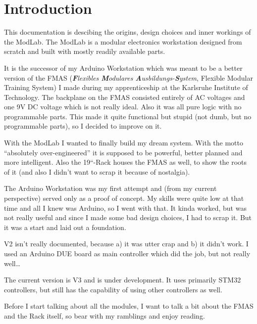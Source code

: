 \chapter{Introduction}

This documentation is descibing the origins, design choices and inner workings of the ModLab. The ModLab is a modular electronics workstation designed from scratch and built with mostly readily available parts. 

It is the successor of my Arduino Workstation which was meant to be a better version of the FMAS (\textit{\textbf{F}lexibles \textbf{M}odulares \textbf{A}usbildungs-\textbf{S}ystem}, Flexible Modular Training System) I made during my apprenticeship at the Karlsruhe Institute of Technology. The backplane on the FMAS consisted entirely of AC voltages and one 9V DC voltage which is not really ideal. Also it was all pure logic with no programmable parts. This made it quite functional but stupid (not dumb, but no programmable parts), so I decided to improve on it. 

With the ModLab I wanted to finally build my dream system. With the motto ``absolutely over-engineered'' it is supposed to be powerful, better planned and more intelligent. Also the 19``-Rack houses the FMAS as well, to show the roots of it (and also I didn't want to scrap it because of nostalgia). 

The Arduino Workstation was my first attempt and (from my current perspective) served only as a proof of concept. My skills were quite low at that time and all I knew was Arduino, so I went with that. It kinda worked, but was not really useful and since I made some bad design choices, I had to scrap it. But it was a start and laid out a foundation. 

V2 isn't really documented, because a) it was utter crap and b) it didn't work. I used an Arduino DUE board as main controller which did the job, but not really well\dots

The current version is V3 and is under development. It uses primarily STM32 controllers, but still has the capability of using other controllers as well. 

Before I start talking about all the modules, I want to talk a bit about the FMAS and the Rack itself, so bear with my ramblings and enjoy reading.